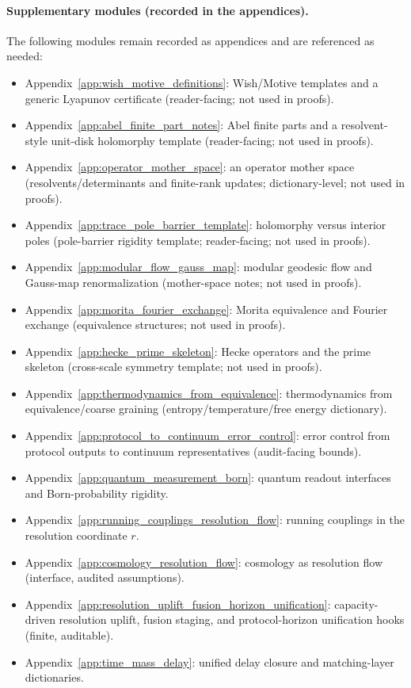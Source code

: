 \paragraph{Supplementary modules (recorded in the appendices).}
\AuditTag The following modules remain recorded as appendices and are referenced as needed:
\begin{itemize}
\item Appendix~\ref{app:wish_motive_definitions}: Wish/Motive templates and a generic Lyapunov certificate (reader-facing; not used in proofs).
\item Appendix~\ref{app:abel_finite_part_notes}: Abel finite parts and a resolvent-style unit-disk holomorphy template (reader-facing; not used in proofs).
\item Appendix~\ref{app:operator_mother_space}: an operator mother space (resolvents/determinants and finite-rank updates; dictionary-level; not used in proofs).
\item Appendix~\ref{app:trace_pole_barrier_template}: holomorphy versus interior poles (pole-barrier rigidity template; reader-facing; not used in proofs).
\item Appendix~\ref{app:modular_flow_gauss_map}: modular geodesic flow and Gauss-map renormalization (mother-space notes; not used in proofs).
\item Appendix~\ref{app:morita_fourier_exchange}: Morita equivalence and Fourier exchange (equivalence structures; not used in proofs).
\item Appendix~\ref{app:hecke_prime_skeleton}: Hecke operators and the prime skeleton (cross-scale symmetry template; not used in proofs).
\item Appendix~\ref{app:thermodynamics_from_equivalence}: thermodynamics from equivalence/coarse graining (entropy/temperature/free energy dictionary).
\item Appendix~\ref{app:protocol_to_continuum_error_control}: error control from protocol outputs to continuum representatives (audit-facing bounds).
\item Appendix~\ref{app:quantum_measurement_born}: quantum readout interfaces and Born-probability rigidity.
\item Appendix~\ref{app:running_couplings_resolution_flow}: running couplings in the resolution coordinate $r$.
\item Appendix~\ref{app:cosmology_resolution_flow}: cosmology as resolution flow (interface, audited assumptions).
\item Appendix~\ref{app:resolution_uplift_fusion_horizon_unification}: capacity-driven resolution uplift, fusion staging, and protocol-horizon unification hooks (finite, auditable).
\item Appendix~\ref{app:time_mass_delay}: unified delay closure and matching-layer dictionaries.
\end{itemize}
